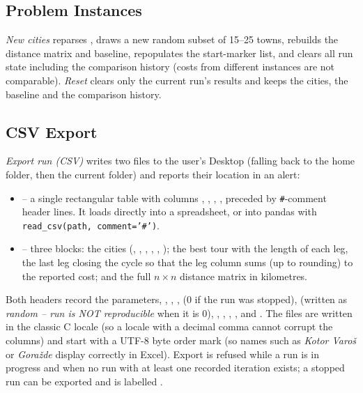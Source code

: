 \documentclass[11pt,a4paper]{article}
\begin{document}
\subsection{Problem Instances}
\emph{New cities} reparses , draws a new random subset of 15--25 towns, rebuilds the
distance matrix and baseline, repopulates the start-marker list, and clears all run state including the
comparison history (costs from different instances are not comparable). \emph{Reset} clears only the
current run's results and keeps the cities, the baseline and the comparison history.

\subsection{CSV Export}
\emph{Export run (CSV)} writes two files to the user's Desktop (falling back to the home folder, then the
current folder) and reports their location in an alert:
\begin{itemize}
  \item {} -- a single rectangular table with columns
        , , , , preceded by
        \texttt{\#}-comment header lines. It loads directly into a spreadsheet, or into pandas with
        \texttt{read\_csv(path, comment='\#')}.
  \item {} -- three blocks: the cities (, ,
        , , , ); the best tour with the length of each
        leg, the last leg closing the cycle so that the leg column sums (up to rounding) to the reported cost; and the full
        $n\times n$ distance matrix in kilometres.
\end{itemize}
Both headers record the parameters, , , ,
 (0 if the run was stopped),  (written as \emph{random -- run is NOT reproducible}
when it is 0), , , ,
,  and . The files are written in the
classic C locale (so a locale with a decimal comma cannot corrupt the columns) and start with a UTF-8 byte
order mark (so names such as \emph{Kotor Varoš} or \emph{Goražde} display correctly in Excel). Export is
refused while a run is in progress and when no run with at least one recorded iteration exists; a stopped
run can be exported and is labelled .
\end{document}
